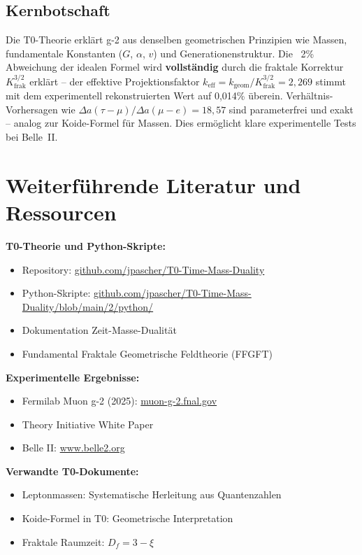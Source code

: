 	\subsection{Kernbotschaft}
	
	\begin{keypoint}
		Die T0-Theorie erklärt g-2 aus denselben geometrischen Prinzipien wie Massen, fundamentale Konstanten ($G$, $\alpha$, $v$) und Generationenstruktur. Die ~2\% Abweichung der idealen Formel wird \textbf{vollständig} durch die fraktale Korrektur $K_\text{frak}^{3/2}$ erklärt -- der effektive Projektionsfaktor $k_\text{eff} = k_\text{geom}/K_\text{frak}^{3/2} = 2{,}269$ stimmt mit dem experimentell rekonstruierten Wert auf 0{,}014\% überein. Verhältnis-Vorhersagen wie $\Delta a(\tau - \mu) / \Delta a(\mu - e) = 18{,}57$ sind parameterfrei und exakt -- analog zur Koide-Formel für Massen. Dies ermöglicht klare experimentelle Tests bei Belle~II.
	\end{keypoint}
	
	\section*{Weiterführende Literatur und Ressourcen}
	
	\textbf{T0-Theorie und Python-Skripte:}
	\begin{itemize}
		\item Repository: \href{https://github.com/jpascher/T0-Time-Mass-Duality}{github.com/jpascher/T0-Time-Mass-Duality}
		\item Python-Skripte: \href{https://github.com/jpascher/T0-Time-Mass-Duality/blob/main/2/python/}{github.com/jpascher/T0-Time-Mass-Duality/blob/main/2/python/}
		\item Dokumentation Zeit-Masse-Dualität
		\item Fundamental Fraktale Geometrische Feldtheorie (FFGFT)
	\end{itemize}
	
	\textbf{Experimentelle Ergebnisse:}
	\begin{itemize}
		\item Fermilab Muon g-2 (2025): \href{https://muon-g-2.fnal.gov/}{muon-g-2.fnal.gov}
		\item Theory Initiative White Paper
		\item Belle II: \href{https://www.belle2.org/}{www.belle2.org}
	\end{itemize}
	
	\textbf{Verwandte T0-Dokumente:}
	\begin{itemize}
		\item Leptonmassen: Systematische Herleitung aus Quantenzahlen
		\item Koide-Formel in T0: Geometrische Interpretation
		\item Fraktale Raumzeit: $D_f = 3 - \xi$
	\end{itemize}
	